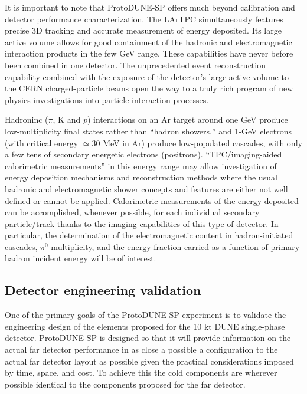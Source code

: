 It is important to note that ProtoDUNE-SP offers much beyond calibration  and detector performance characterization.  The LArTPC simultaneously features precise 3D tracking and accurate measurement of energy deposited. Its large active volume allows for good containment of the hadronic and electromagnetic interaction products in the few GeV range. These capabilities have never before been combined in one detector.  The unprecedented event reconstruction capability combined with the exposure of the detector's large active volume to the CERN charged-particle beams open the way to a truly rich program of new physics investigations into particle interaction processes. 


 Hadroninc ($\pi$, K and $p$) interactions on an Ar target around one GeV produce low-multiplicity final states rather than ``hadron showers,'' 
 and 1-GeV electrons  (with critical energy $\simeq 30$ MeV in Ar) produce low-populated cascades, with only a few tens of secondary energetic electrons (positrons). 
``TPC/imaging-aided calorimetric measurements'' in this energy range may allow investigation of 
energy deposition mechanisms and reconstruction methods where the usual hadronic and electromagnetic shower concepts and features are either not well defined or cannot be applied.
Calorimetric measurements of the energy deposited can be accomplished,  whenever possible, for each individual secondary particle/track thanks to the imaging capabilities of this type of detector.
In particular, the determination of the electromagnetic  content in hadron-initiated cascades, $\pi^0$ multiplicity, and the energy fraction carried as a function of primary hadron incident energy will be of interest.



\subsection{Detector engineering validation}  

One of the primary goals of the ProtoDUNE-SP experiment is to validate the engineering design of the elements proposed for the 10 kt DUNE single-phase detector. ProtoDUNE-SP is designed so that it will provide information on the actual far detector performance in as close a possible a configuration to the actual far detector layout as possible given the practical considerations imposed by time, space, and cost. To achieve this the cold components are wherever possible identical to the components proposed for the far detector. 

